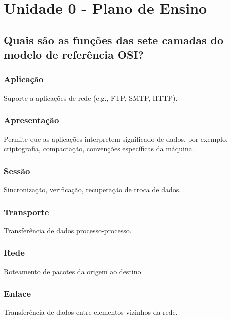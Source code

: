 \section{Unidade 0 - Plano de \newline Ensino}

\subsection{Quais são as funções das sete camadas do modelo de
\newline referência OSI?}

\subsubsection{Aplicação}

Suporte a aplicações de rede (e.g., FTP, SMTP, HTTP).

\subsubsection{Apresentação}

Permite que as aplicações interpretem significado de
dados, por exemplo, criptografia, compactação, convenções específicas
da máquina.

\subsubsection{Sessão}

Sincronização, verificação, recuperação de troca de dados.

\subsubsection{Transporte}

Transferência de dados processo-processo.

\subsubsection{Rede}

Roteamento de pacotes da origem ao destino.

\subsubsection{Enlace}

Transferência de dados entre elementos vizinhos da rede.

